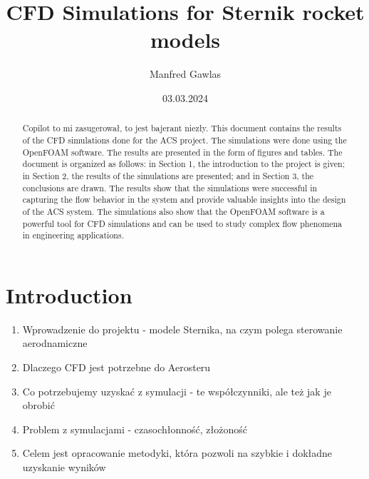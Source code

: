 \documentclass{article}
\title{CFD Simulations for Sternik rocket models}
\author{Manfred Gawlas}
\date{03.03.2024}
\begin{document}
\maketitle

\begin{abstract}
    Copilot to mi zasugerował, to jest bajerant niezły. This document contains the results of the CFD simulations done for the ACS project. The simulations were done using the OpenFOAM software. The results are presented in the form of figures and tables. The document is organized as follows: in Section 1, the introduction to the project is given; in Section 2, the results of the simulations are presented; and in Section 3, the conclusions are drawn. The results show that the simulations were successful in capturing the flow behavior in the system and provide valuable insights into the design of the ACS system. The simulations also show that the OpenFOAM software is a powerful tool for CFD simulations and can be used to study complex flow phenomena in engineering applications.
\end{abstract}

\tableofcontents

\section{Introduction}
\begin{enumerate}
    \item Wprowadzenie do projektu - modele Sternika, na czym polega sterowanie aerodnamiczne
    \item Dlaczego CFD jest potrzebne do Aerosteru
    \item Co potrzebujemy uzyskać z symulacji - te współczynniki, ale też jak 
    je obrobić 
    \item Problem z symulacjami - czasochłonność, złożoność
    \item Celem jest opracowanie metodyki, która pozwoli na szybkie i dokładne
    uzyskanie wyników
\end{enumerate}
\end{document}
